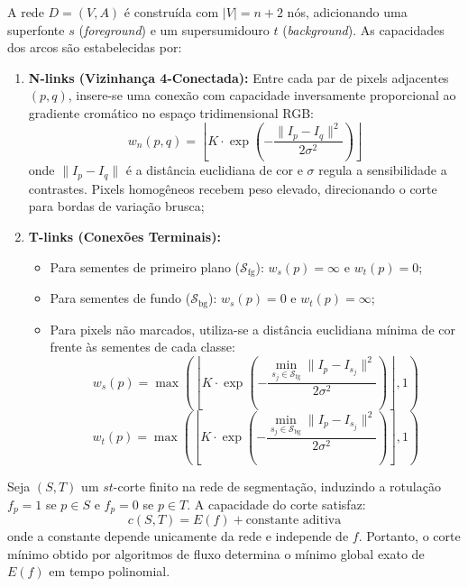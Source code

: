 A rede $D = (V, A)$ é construída com $|V| = n + 2$ nós, adicionando uma superfonte $s$ (\textit{foreground}) e um supersumidouro $t$ (\textit{background}). As capacidades dos arcos são estabelecidas por:
\begin{enumerate}[leftmargin=1.5em, itemsep=0.15em, topsep=0.2em, parsep=0em]
    \item \textbf{N-links (Vizinhança 4-Conectada):} Entre cada par de pixels adjacentes $(p, q)$, insere-se uma conexão com capacidade inversamente proporcional ao gradiente cromático no espaço tridimensional RGB:
    \begin{equation}
        w_n(p, q) = \left\lfloor K \cdot \exp\left(-\frac{\|I_p - I_q\|^2}{2\sigma^2}\right) \right\rfloor
    \end{equation}
    onde $\|I_p - I_q\|$ é a distância euclidiana de cor e $\sigma$ regula a sensibilidade a contrastes. Pixels homogêneos recebem peso elevado, direcionando o corte para bordas de variação brusca;
    \item \textbf{T-links (Conexões Terminais):}
    \begin{itemize}
        \item Para sementes de primeiro plano ($\mathcal{S}_{\text{fg}}$): $w_s(p) = \infty$ e $w_t(p) = 0$;
        \item Para sementes de fundo ($\mathcal{S}_{\text{bg}}$): $w_s(p) = 0$ e $w_t(p) = \infty$;
        \item Para pixels não marcados, utiliza-se a distância euclidiana mínima de cor frente às sementes de cada classe:
        \begin{equation}
            w_s(p) = \max\left( \left\lfloor K \cdot \exp\left(-\frac{\min_{s_j \in \mathcal{S}_{\text{fg}}} \|I_p - I_{s_j}\|^2}{2\sigma^2}\right) \right\rfloor, 1 \right)
        \end{equation}
        \begin{equation}
            w_t(p) = \max\left( \left\lfloor K \cdot \exp\left(-\frac{\min_{s_j \in \mathcal{S}_{\text{bg}}} \|I_p - I_{s_j}\|^2}{2\sigma^2}\right) \right\rfloor, 1 \right)
        \end{equation}
    \end{itemize}
\end{enumerate}

\begin{prop}
Seja $(S, T)$ um $st$-corte finito na rede de segmentação, induzindo a rotulação $f_p = 1$ se $p \in S$ e $f_p = 0$ se $p \in T$. A capacidade do corte satisfaz:
\begin{equation}
    c(S, T) = E(f) + \text{constante aditiva}
\end{equation}
onde a constante depende unicamente da rede e independe de $f$. Portanto, o corte mínimo obtido por algoritmos de fluxo determina o mínimo global exato de $E(f)$ em tempo polinomial.
\end{prop}

